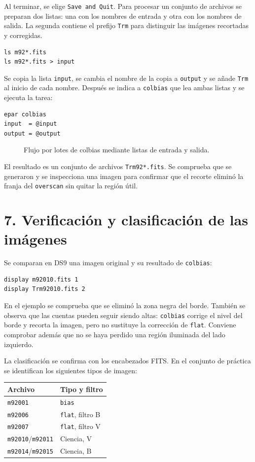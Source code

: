 \documentclass[11pt,twocolumn]{article}
\newcommand{\widefigure}[2]{\begin{figure}[!t]\centering\caption{#2}\end{figure}}
\begin{document}
Al terminar, se elige \texttt{Save and Quit}. Para procesar un conjunto de
archivos se preparan dos listas: una con los nombres de entrada y otra con los
nombres de salida. La segunda contiene el prefijo \texttt{Trm} para distinguir
las imágenes recortadas y corregidas.

\begin{verbatim}
ls m92*.fits
ls m92*.fits > input
\end{verbatim}

Se copia la lista \texttt{input}, se cambia el nombre de la copia a
\texttt{output} y se añade \texttt{Trm} al inicio de cada nombre. Después se
indica a \texttt{colbias} que lea ambas listas y se ejecuta la tarea:

\begin{verbatim}
epar colbias
input  = @input
output = @output
\end{verbatim}

\widefigure{figuras/listas_colbias.tex}{Flujo por lotes de colbias mediante listas de entrada y salida.}

El resultado es un conjunto de archivos \texttt{Trm92*.fits}. Se comprueba que
se generaron y se inspecciona una imagen para confirmar que el recorte eliminó
la franja del \texttt{overscan} sin quitar la región útil.

\section*{7. Verificación y clasificación de las imágenes}

Se comparan en DS9 una imagen original y su resultado de \texttt{colbias}:

\begin{verbatim}
display m92010.fits 1
display Trm92010.fits 2
\end{verbatim}

En el ejemplo se comprueba que se eliminó la zona negra del borde. También se
observa que las cuentas pueden seguir siendo altas: \texttt{colbias} corrige
el nivel del borde y recorta la imagen, pero no sustituye la corrección de
\texttt{flat}. Conviene comprobar además que no se haya perdido una región
iluminada del lado izquierdo.

La clasificación se confirma con los encabezados FITS. En el conjunto de
práctica se identifican los siguientes tipos de imagen:

\begin{center}
\small
\begin{tabular}{ll}
\hline
Archivo & Tipo y filtro\\
\hline
\texttt{m92001} & \texttt{bias}\\
\texttt{m92006} & \texttt{flat}, filtro B\\
\texttt{m92007} & \texttt{flat}, filtro V\\
\texttt{m92010}/\texttt{m92011} & Ciencia, V\\
\texttt{m92014}/\texttt{m92015} & Ciencia, B\\
\hline
\end{tabular}
\end{center}
\end{document}
